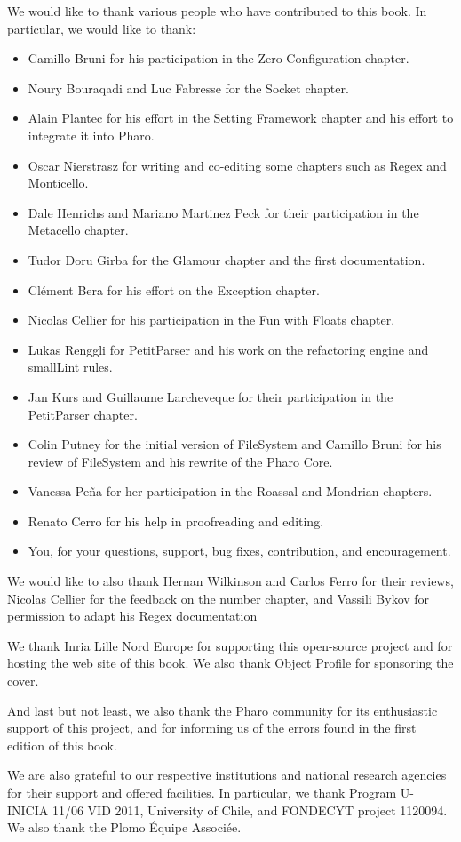 \documentclass[a4paper,10pt,twoside]{book}
\begin{document}
We would like to thank various people who have contributed to this book. In particular, we would like to thank:
\begin{itemize}
\item Camillo Bruni for his participation in the Zero Configuration chapter.
\item Noury Bouraqadi and Luc Fabresse for the Socket chapter.
\item Alain Plantec for his effort in the Setting Framework chapter and his effort to integrate it into Pharo.
\item Oscar Nierstrasz for writing and co-editing some chapters such as Regex and Monticello.
\item Dale Henrichs and Mariano Martinez Peck for their participation in the Metacello chapter.
\item Tudor Doru Girba for the Glamour chapter and the first documentation.
\item Cl\'ement Bera for his effort on the Exception chapter.
\item Nicolas Cellier for his participation in the Fun with Floats chapter.
\item Lukas Renggli for PetitParser and his work on the refactoring engine and smallLint rules. 
\item Jan Kurs and Guillaume Larcheveque for their participation in the PetitParser chapter.
\item Colin Putney for the initial version of FileSystem and Camillo Bruni for his review of FileSystem and his rewrite of the Pharo Core.
\item Vanessa Pe\~na for her participation in the Roassal and Mondrian chapters.
\item Renato Cerro for his help in proofreading and editing.
\item You, for your questions, support, bug fixes, contribution, and encouragement.
\end{itemize}

We would like to also thank Hernan Wilkinson and Carlos Ferro for their reviews, Nicolas Cellier for the feedback on the number chapter, and Vassili Bykov for permission to adapt his Regex documentation

We thank Inria Lille Nord Europe for supporting this open-source project and for hosting the web site of this book. We also thank Object Profile for sponsoring the cover.

And last but not least, we also thank the Pharo community for its enthusiastic support of this project, and for informing us of the errors found in the first edition of this book.

We are also grateful to our respective institutions and national research agencies for their support and offered facilities. In particular, we thank Program U-INICIA 11/06 VID 2011, University of Chile, and FONDECYT project 1120094. We also thank the Plomo \'Equipe Associ\'ee.

\ifx\wholebook\relax\else
   
   
\end{document}
